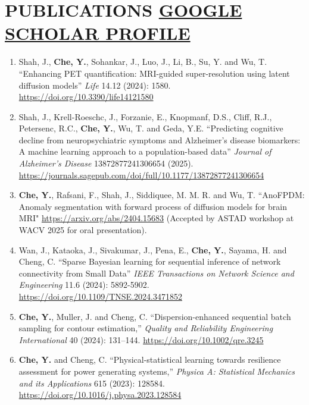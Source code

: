 \documentclass[10pt]{article}
\begin{document}
\vspace{-2em}
\section*{PUBLICATIONS \hfill\hfill\hfill\hfill \href{https://scholar.google.com/citations?user=3Z6Z9ZkAAAAJ&hl=en}{GOOGLE SCHOLAR PROFILE}} 
\vspace{-0.5em}
\begin{enumerate}
	\setlength\itemsep{0.5pt}
	\item Shah, J., {\bf Che, Y.}, Sohankar, J., Luo, J., Li, B., Su, Y. and Wu, T. ``Enhancing PET quantification: MRI-guided super-resolution using latent diffusion models'' \textit{Life} 14.12 (2024): 1580. \url{https://doi.org/10.3390/life14121580}
	
	\item Shah, J., Krell-Roeschc, J., Forzanie, E., Knopmanf, D.S., Cliff, R.J., Petersenc, R.C., {\bf Che, Y.}, Wu, T. and Geda, Y.E. ``Predicting cognitive decline from neuropsychiatric symptoms and Alzheimer’s disease biomarkers: A machine learning approach to a population-based data'' \textit{Journal of Alzheimer's Disease} 13872877241306654 (2025). \url{https://journals.sagepub.com/doi/full/10.1177/13872877241306654}
	
	\item {\bf Che, Y.}, Rafsani, F., Shah, J., Siddiquee, M. M. R. and Wu, T. ``AnoFPDM: Anomaly segmentation with forward process of diffusion models for brain MRI" \url{https://arxiv.org/abs/2404.15683} (Accepted by ASTAD workshop at WACV 2025 for oral presentation).

	\item Wan, J., Kataoka, J., Sivakumar, J., Pena, E., {\bf Che, Y.}, Sayama, H. and Cheng, C. ``Sparse Bayesian learning for sequential inference of network connectivity from Small Data'' \textit{IEEE Transactions on Network Science and Engineering} 11.6 (2024): 5892-5902. \url{https://doi.org/10.1109/TNSE.2024.3471852}
	
	\item {\bf Che, Y.}, Muller, J. and Cheng, C. ``Dispersion-enhanced sequential batch sampling for contour estimation,'' \textit{Quality and Reliability Engineering International} 40 (2024): 131–144. \url{https://doi.org/10.1002/qre.3245} 

	\item {\bf Che, Y.} and Cheng, C. ``Physical-statistical learning towards resilience assessment for power generating systems,'' \textit{Physica A: Statistical Mechanics and its Applications} 615 (2023): 128584. \url{https://doi.org/10.1016/j.physa.2023.128584}


\end{enumerate}
\end{document}
